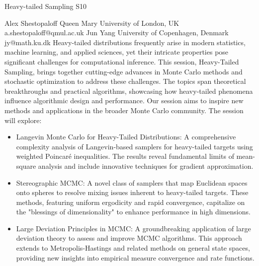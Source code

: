 \begin{session}
 {Heavy-tailed Sampling}%
 {}%
 {}%
 {}%
 {}%
 {}%
 {}%
 {S10}%
 {\thirdorganizer{}{}{}}%

 {Alex Shestopaloff}%
 {Queen Mary University of London, UK}%
 {a.shestopaloff@qmul.ac.uk}%
 {Jun Yang}%
 {University of Copenhagen, Denmark}%
 {jy@math.ku.dk}%
 Heavy-tailed distributions frequently arise in modern statistics, machine learning, and applied sciences, yet their intricate properties pose significant challenges for computational inference. This session, Heavy-Tailed Sampling, brings together cutting-edge advances in Monte Carlo methods and stochastic optimization to address these challenges. The topics span theoretical breakthroughs and practical algorithms, showcasing how heavy-tailed phenomena influence algorithmic design and performance. Our session aims to inspire new methods and applications in the broader Monte Carlo community. The session will explore:
 \begin{itemize}
 \item
 Langevin Monte Carlo for Heavy-Tailed Distributions: A comprehensive complexity analysis of Langevin-based samplers for heavy-tailed targets using weighted Poincaré inequalities. The results reveal fundamental limits of mean-square analysis and include innovative techniques for gradient approximation.
 \item
 Stereographic MCMC: A novel class of samplers that map Euclidean spaces onto spheres to resolve mixing issues inherent to heavy-tailed targets. These methods, featuring uniform ergodicity and rapid convergence, capitalize on the "blessings of dimensionality" to enhance performance in high dimensions.
 \item
 Large Deviation Principles in MCMC: A groundbreaking application of large deviation theory to assess and improve MCMC algorithms. This approach extends to Metropolis-Hastings and related methods on general state spaces, providing new insights into empirical measure convergence and rate functions.

\end{itemize}
\end{session}
